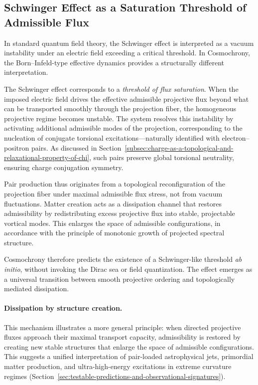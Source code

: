 \subsection{Schwinger Effect as a Saturation Threshold of Admissible Flux}
  \label{subsec:schwinger-saturation}

  In standard quantum field theory, the Schwinger effect is interpreted as a
  vacuum instability under an electric field exceeding a critical threshold.
  In Cosmochrony, the Born--Infeld-type effective dynamics provides a
  structurally different interpretation.

  The Schwinger effect corresponds to a \emph{threshold of flux saturation}.
  When the imposed electric field drives the effective admissible projective
  flux beyond what can be transported smoothly through the projection fiber,
  the homogeneous projective regime becomes unstable.
  The system resolves this instability by activating additional admissible
  modes of the projection, corresponding to the nucleation of conjugate
  torsional excitations---naturally identified with electron--positron pairs.
  As discussed in
  Section~\ref{subsec:charge-as-a-topological-and-relaxational-property-of-chi},
  such pairs preserve global torsional neutrality, ensuring charge
  conjugation symmetry.

  Pair production thus originates from a topological reconfiguration of the
  projection fiber under maximal admissible flux stress, not from vacuum
  fluctuations.
  Matter creation acts as a dissipation channel that restores admissibility
  by redistributing excess projective flux into stable, projectable vortical
  modes.
  This enlarges the space of admissible configurations, in accordance with
  the principle of monotonic growth of projected spectral structure.

  Cosmochrony therefore predicts the existence of a Schwinger-like threshold
  \emph{ab initio}, without invoking the Dirac sea or field quantization.
  The effect emerges as a universal transition between smooth projective
  ordering and topologically mediated dissipation.

  \paragraph{Dissipation by structure creation.}
    This mechanism illustrates a more general principle: when directed
    projective fluxes approach their maximal transport capacity, admissibility
    is restored by creating new stable structures that enlarge the space of
    admissible configurations.
    This suggests a unified interpretation of pair-loaded astrophysical jets,
    primordial matter production, and ultra-high-energy excitations in extreme
    curvature regimes
    (Section~\ref{sec:testable-predictions-and-observational-signatures}).
